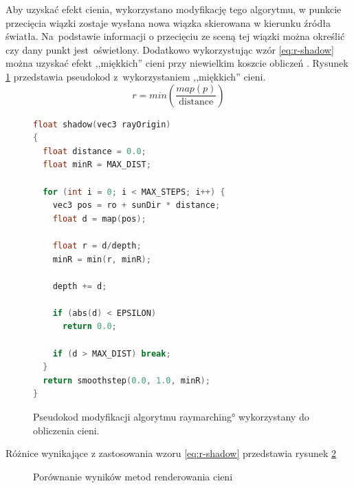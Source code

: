 Aby uzyskać efekt cienia, wykorzystano modyfikację tego algorytmu, w punkcie przecięcia wiązki zostaje wysłana nowa wiązka skierowana w kierunku źródła światła. Na~podstawie informacji o przecięciu ze sceną tej wiązki można określić czy dany punkt jest~oświetlony. Dodatkowo wykorzystując wzór \ref{eq:r-shadow} można uzyskać efekt ,,miękkich'' cieni przy niewielkim koszcie obliczeń \cite{bib:iqsoftshadow}.
Rysunek \ref{fig:pseudokod:shadow} przedstawia pseudokod z~wykorzystaniem ,,miękkich'' cieni.
\begin{equation}
\label{eq:r-shadow}
r = min(\frac{map(p)}{\text{distance}})
\end{equation}
\begin{figure}[H]
\centering
\begin{lstlisting}[language=C]
float shadow(vec3 rayOrigin)
{
  float distance = 0.0;
  float minR = MAX_DIST;

  for (int i = 0; i < MAX_STEPS; i++) {
    vec3 pos = ro + sunDir * distance;
    float d = map(pos);

    float r = d/depth;
    minR = min(r, minR);

    depth += d;

    if (abs(d) < EPSILON)
      return 0.0;

    if (d > MAX_DIST) break;
  }
  return smoothstep(0.0, 1.0, minR);
}
\end{lstlisting}
\caption{Pseudokod modyfikacji algorytmu \ang{raymarching} wykorzystany do obliczenia cieni.}
\label{fig:pseudokod:shadow}
\end{figure}

Różnice wynikające z zastosowania wzoru \ref{eq:r-shadow} przedstawia rysunek \ref{fig:shadow-comp}

\begin{figure}[H]
\centering
{}
\caption{Porównanie wyników metod renderowania cieni}
\label{fig:shadow-comp}
\end{figure}

